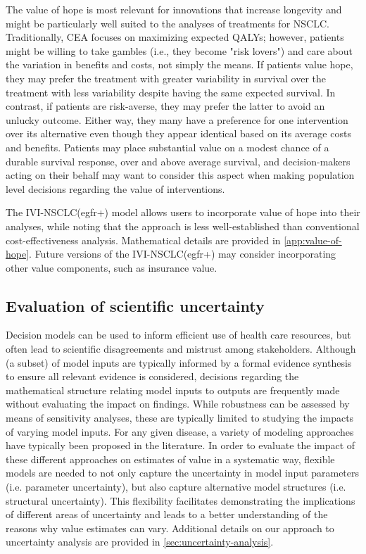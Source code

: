 \documentclass[11pt,final,fleqn]{article}\usepackage[]{graphicx}\usepackage[]{color}
\theoremstyle{plain}
\begin{document}
{The value of hope is most relevant for innovations that increase longevity and might be particularly well suited to the analyses of treatments for NSCLC. Traditionally, CEA focuses on maximizing expected QALYs; however, patients might be willing to take gambles (i.e., they become "risk lovers") and care about the variation in benefits and costs, not simply the means. If patients value hope, they may prefer the treatment with greater variability in survival over the treatment with less variability despite having the same expected survival. In contrast, if patients are risk-averse, they may prefer the latter to avoid an unlucky outcome. Either way, they many have a preference for one intervention over its alternative even though they appear identical based on its average costs and benefits. Patients may place substantial value on a modest chance of a durable survival response, over and above average survival, and decision-makers acting on their behalf may want to consider this aspect when making population level decisions regarding the value of interventions. 

The IVI-NSCLC(egfr+) model allows users to incorporate value of hope into their analyses, while noting that the approach is less well-established than conventional cost-effectiveness analysis. Mathematical details are provided in \autoref{app:value-of-hope}. Future versions of the IVI-NSCLC(egfr+) may consider incorporating other value components, such as insurance value.

\subsection{Evaluation of scientific uncertainty}
Decision models can be used to inform efficient use of health care resources, but often lead to scientific disagreements and mistrust among stakeholders. Although (a subset) of model inputs are typically informed by a formal evidence synthesis to ensure all relevant evidence is considered, decisions regarding the mathematical structure relating model inputs to outputs are frequently made without evaluating the impact on findings. While robustness can be assessed by means of sensitivity analyses, these are typically limited to studying the impacts of varying model inputs. For any given disease, a variety of modeling approaches have typically been proposed in the literature. In order to evaluate the impact of these different approaches on estimates of value in a systematic way,  flexible models are needed to not only capture the uncertainty in model input parameters (i.e. parameter uncertainty), but also capture alternative model structures (i.e. structural uncertainty). This flexibility facilitates demonstrating the implications of different areas of uncertainty and leads to a better understanding of the reasons why value estimates can vary. Additional details on our approach to uncertainty analysis are provided in \autoref{sec:uncertainty-analysis}.


}
\end{document}

